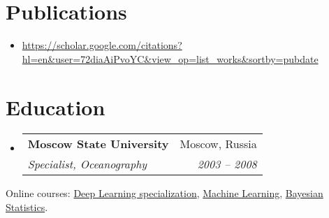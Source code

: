 \documentclass[letterpaper,11pt]{article}
\makeatletter
\newcommand{\resumePubItem}[2]{
  \item\small{
    \textbf{#1}{ #2 \vspace{-2pt}}
  }
}
\newcommand{\resumeSubheading}[4]{
  \vspace{-1pt}\item
    \begin{tabular*}{0.97\textwidth}[t]{l@{\extracolsep{\fill}}r}
      \textbf{#1} & #2 \\
      \textit{\small#3} & \textit{\small #4} \\
    \end{tabular*}\vspace{+1pt}
}
\newcommand{\resumeSubHeadingListStart}{\begin{itemize}[leftmargin=*]}
\newcommand{\resumeSubHeadingListEnd}{\end{itemize}}
\makeatother
\begin{document}
\section{Publications}
  \resumeSubHeadingListStart
    \resumePubItem{}
      {\url{https://scholar.google.com/citations?hl=en&user=72diaAiPvoYC&view_op=list_works&sortby=pubdate}}
  \resumeSubHeadingListEnd

\section{Education}
  \resumeSubHeadingListStart
    \resumeSubheading
      {Moscow State University}{Moscow, Russia}
      {Specialist, Oceanography}{2003 -- 2008}
  \resumeSubHeadingListEnd
  
  Online courses:
  {\href{https://coursera.org/share/738f07c3514e74b4b4a2ec4c7df53d11}{Deep Learning specialization},
   \href{https://coursera.org/share/a7e216966ca1e16fd6c58b7d58cb0806}{Machine Learning},
   \href{https://coursera.org/share/2a20ba63d42f5a2557db34e3e9837382}{Bayesian Statistics}.}

\end{document}
